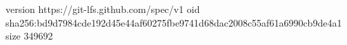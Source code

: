 version https://git-lfs.github.com/spec/v1
oid sha256:bd9d7984cde192d45e44af60275fbe9741d68dac2008c55af61a6990cb9de4a1
size 349692

